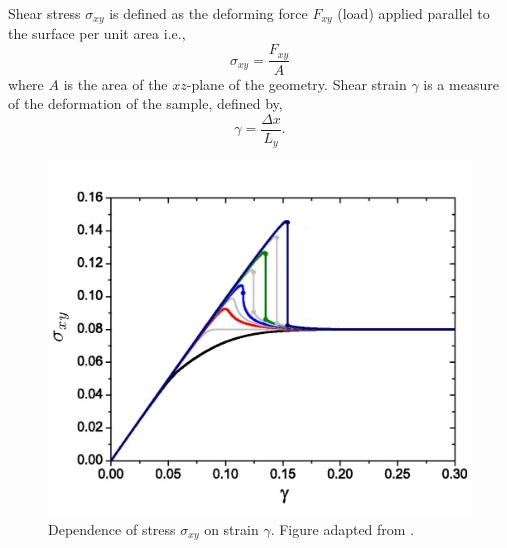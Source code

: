     Shear stress $\sigma_{xy}$ is defined as the deforming force $F_{xy}$ (load)  applied parallel to the surface per unit area i.e.,
    \begin{equation}
        \sigma_{xy} = \frac{F_{xy}}{A}
    \end{equation}
    where $A$ is the area of the $xz$-plane of the geometry. Shear strain $\gamma$ is a measure of the deformation of the sample, defined by,
    \begin{equation}
        \gamma = \frac{\Delta x}{L_y}.
    \end{equation}
    
    \begin{figure}[hbt!]
	\includegraphics[width=14cm]{figs/fig_stressStrain.pdf}
	\centering
	\caption[{\em Dependence of stress $\sigma_{xy}$ on strain $\gamma$}]{Dependence of stress $\sigma_{xy}$ on strain $\gamma$. Figure adapted from \cite{ozawa2018random}. \label{fig_stressStrain}}
    \end{figure}
    
